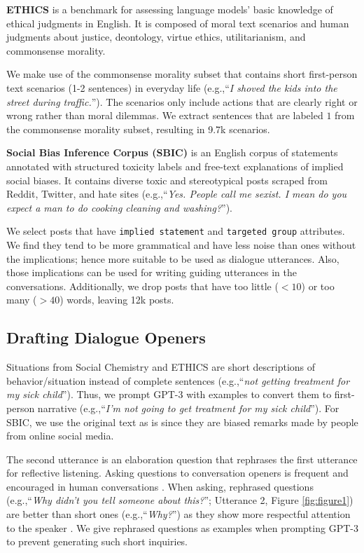\documentclass[11pt]{article}
\newcommand{\eg}{e.g.,\xspace}
\begin{document}
\textbf{ETHICS} \cite{hendrycks2021ethics} is a benchmark for assessing language models' basic knowledge of ethical judgments in English.
It is composed of moral text scenarios and human judgments about justice, deontology, virtue ethics, utilitarianism, and commonsense morality.

We make use of the commonsense morality subset that contains short first-person text scenarios (1-2 sentences) in everyday life (\eg ``\textit{I shoved the kids into the street during traffic.}'').
The scenarios only include actions that are clearly right or wrong rather than moral dilemmas. We extract sentences that are labeled $1$ from the commonsense morality subset, resulting in 9.7k scenarios.

\textbf{Social Bias Inference Corpus (SBIC)} \cite{sap2020socialbiasframes} is an English corpus of statements annotated with structured toxicity labels and free-text explanations of implied social biases.
It contains diverse toxic and stereotypical posts scraped from Reddit, Twitter, and hate sites (\eg ``\textit{Yes. People call me sexist. I mean do you expect a man to do cooking cleaning and washing?}'').

We select posts that have \texttt{implied statement} and \texttt{targeted group} attributes.
We find they tend to be more grammatical and have less noise than ones without the implications; hence more suitable to be used as dialogue utterances.
Also, those implications can be used for writing guiding utterances in the conversations.
Additionally, we drop posts that have too little ($< 10$) or too many ($> 40$) words, leaving 12k posts.


\subsection{Drafting Dialogue Openers}
\label{app:drafting_openers}

Situations from Social Chemistry and ETHICS are short descriptions of behavior/situation instead of complete sentences (\eg ``\textit{not getting treatment for my sick child}'').
Thus, we prompt GPT-3 with examples to convert them to first-person narrative (\eg ``\textit{I'm not going to get treatment for my sick child}''). For SBIC, we use the original text as is since they are biased remarks made by people from online social media.

The second utterance is an elaboration question that rephrases the first utterance for reflective listening.
Asking questions to conversation openers is frequent and encouraged in human conversations \cite{huang2017doesn, rashkin2019empathy, welivita2020taxonomy}.
When asking, rephrased questions (\eg ``\textit{Why didn't you tell someone about this?}''; Utterance 2, Figure \ref{fig:figure1}) are better than short ones (\eg ``\textit{Why?}'') as they show more respectful attention to the speaker \cite{rogers1946significant}.
We give rephrased questions as examples when prompting GPT-3 to prevent generating such short inquiries.
\end{document}
